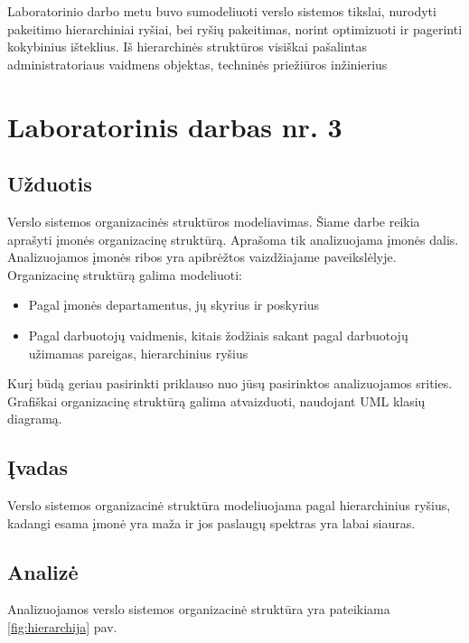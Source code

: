 \documentclass[10pt]{IEEEtran}
\begin{document}
            Laboratorinio darbo metu buvo sumodeliuoti verslo sistemos tikslai, nurodyti pakeitimo hierarchiniai ryšiai, bei ryšių pakeitimas, norint optimizuoti ir pagerinti kokybinius išteklius. Iš hierarchinės struktūros visiškai pašalintas administratoriaus vaidmens objektas, techninės priežiūros inžinierius 

    \section{Laboratorinis darbas nr. 3}

        \subsection{Užduotis}

            Verslo sistemos organizacinės struktūros modeliavimas. Šiame darbe reikia aprašyti įmonės organizacinę struktūrą. Aprašoma tik analizuojama įmonės dalis. Analizuojamos įmonės ribos yra apibrėžtos vaizdžiajame paveikslėlyje. Organizacinę struktūrą galima modeliuoti:
            
            \begin{itemize}
                \item Pagal įmonės departamentus, jų skyrius ir poskyrius
                \item Pagal darbuotojų vaidmenis, kitais žodžiais sakant pagal darbuotojų užimamas pareigas, hierarchinius ryšius
            \end{itemize}

            Kurį būdą geriau pasirinkti priklauso nuo jūsų pasirinktos analizuojamos srities. Grafiškai organizacinę struktūrą galima atvaizduoti, naudojant UML klasių diagramą.

        \subsection{Įvadas}

            Verslo sistemos organizacinė struktūra modeliuojama pagal hierarchinius ryšius, kadangi esama įmonė yra maža ir jos paslaugų spektras yra labai siauras.

        \subsection{Analizė}

            Analizuojamos verslo sistemos organizacinė struktūra yra pateikiama \ref{fig:hierarchija} pav. 
\end{document}
